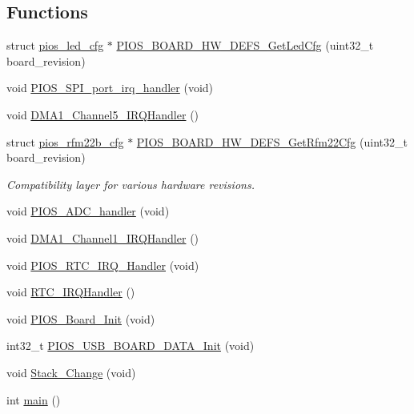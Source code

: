 \subsection*{\-Functions}
\begin{DoxyCompactItemize}
\item 
struct \hyperlink{structpios__led__cfg}{pios\-\_\-led\-\_\-cfg} $\ast$ \hyperlink{group___pip_xtreme_gafb76ae90816003eabf1d90feff7b1a52}{\-P\-I\-O\-S\-\_\-\-B\-O\-A\-R\-D\-\_\-\-H\-W\-\_\-\-D\-E\-F\-S\-\_\-\-Get\-Led\-Cfg} (uint32\-\_\-t board\-\_\-revision)
\item 
void \hyperlink{group___pip_xtreme_gae574ff0c5047e27c39bc2ebc121ad77c}{\-P\-I\-O\-S\-\_\-\-S\-P\-I\-\_\-port\-\_\-irq\-\_\-handler} (void)
\item 
void \hyperlink{group___pip_xtreme_ga8e3a6d7ba4b5da3ec8decb912bd80943}{\-D\-M\-A1\-\_\-\-Channel5\-\_\-\-I\-R\-Q\-Handler} ()
\item 
struct \hyperlink{structpios__rfm22b__cfg}{pios\-\_\-rfm22b\-\_\-cfg} $\ast$ \hyperlink{group___pip_xtreme_ga82ea8b6b6e602117e6fbadfe2d465de3}{\-P\-I\-O\-S\-\_\-\-B\-O\-A\-R\-D\-\_\-\-H\-W\-\_\-\-D\-E\-F\-S\-\_\-\-Get\-Rfm22\-Cfg} (uint32\-\_\-t board\-\_\-revision)
\begin{DoxyCompactList}\small\item\em \-Compatibility layer for various hardware revisions. \end{DoxyCompactList}\item 
void \hyperlink{group___pip_xtreme_gad6ef17a736d2c33cf82ce413c8a9b070}{\-P\-I\-O\-S\-\_\-\-A\-D\-C\-\_\-handler} (void)
\item 
void \hyperlink{group___pip_xtreme_gabd49de55f82b1a0be3edaaf34dbe4b14}{\-D\-M\-A1\-\_\-\-Channel1\-\_\-\-I\-R\-Q\-Handler} ()
\item 
void \hyperlink{group___pip_xtreme_gadc73bf2eccd9d9ff9d8efedd1e743704}{\-P\-I\-O\-S\-\_\-\-R\-T\-C\-\_\-\-I\-R\-Q\-\_\-\-Handler} (void)
\item 
void \hyperlink{group___pip_xtreme_ga97e62d710cac4e413791be18ac03bc88}{\-R\-T\-C\-\_\-\-I\-R\-Q\-Handler} ()
\item 
void \hyperlink{group___pip_xtreme_ga902009c5b1cb57d9f9d60092eb7cacfb}{\-P\-I\-O\-S\-\_\-\-Board\-\_\-\-Init} (void)
\item 
int32\-\_\-t \hyperlink{group___pip_xtreme_ga5efd94ab761f254827f38dba474cf642}{\-P\-I\-O\-S\-\_\-\-U\-S\-B\-\_\-\-B\-O\-A\-R\-D\-\_\-\-D\-A\-T\-A\-\_\-\-Init} (void)
\item 
void \hyperlink{group___pip_xtreme_ga7a789e7b91612099a4a1f355b9e97c24}{\-Stack\-\_\-\-Change} (void)
\item 
int \hyperlink{group___pip_xtreme_gae66f6b31b5ad750f1fe042a706a4e3d4}{main} ()
\end{DoxyCompactItemize}
